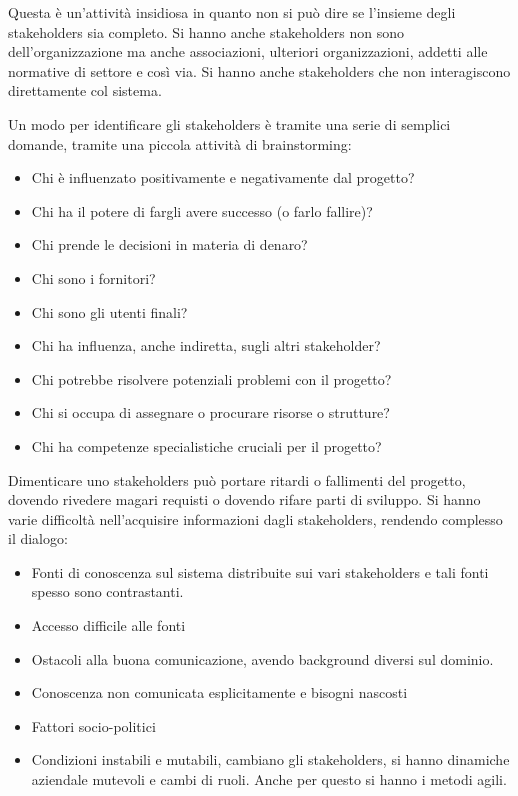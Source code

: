 Questa è un'attività insidiosa in quanto non si può dire se l'insieme degli
stakeholders sia completo. Si hanno anche stakeholders non sono dell'organizzazione
ma anche associazioni, ulteriori organizzazioni, addetti alle normative di settore
e così via. Si hanno anche stakeholders che non interagiscono direttamente col sistema.

Un modo per identificare gli stakeholders è tramite una serie di semplici domande,
tramite una piccola attività di brainstorming:
\begin{itemize}
    \item Chi è influenzato positivamente e negativamente dal progetto?
    \item Chi ha il potere di fargli avere successo (o farlo fallire)?
    \item Chi prende le decisioni in materia di denaro?
    \item Chi sono i fornitori?
    \item Chi sono gli utenti finali?
    \item Chi ha influenza, anche indiretta, sugli altri stakeholder?
    \item Chi potrebbe risolvere potenziali problemi con il progetto?
    \item Chi si occupa di assegnare o procurare risorse o strutture?
    \item Chi ha competenze specialistiche cruciali per il progetto?
\end{itemize}
Dimenticare uno stakeholders può portare ritardi o fallimenti del progetto, dovendo
rivedere magari requisti o dovendo rifare parti di sviluppo. Si hanno varie
difficoltà nell'acquisire informazioni dagli stakeholders, rendendo complesso il dialogo:
\begin{itemize}
    \item Fonti di conoscenza sul sistema distribuite sui vari stakeholders e tali
          fonti spesso sono contrastanti.
    \item Accesso difficile alle fonti
    \item Ostacoli alla buona comunicazione, avendo background diversi sul dominio.
    \item Conoscenza non comunicata esplicitamente e bisogni nascosti
    \item Fattori socio-politici
    \item Condizioni instabili e mutabili, cambiano gli stakeholders, si hanno
          dinamiche aziendale mutevoli e cambi di ruoli. Anche per questo si hanno i metodi agili.
\end{itemize}

